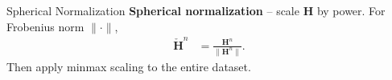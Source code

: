 \documentclass{beamer}
\newcommand{\fignocap}[2]{
	\begin{figure}[!hbtp]
	    \centering
		\texttt{[image: \#2]}
	\end{figure}
}
\begin{document}


  \begin{frame}{Spherical Normalization}
    \textbf{Spherical normalization} -- scale $\mathbf H$ by power. For Frobenius norm $\|\cdot\|$,
    \begin{align}
      \mathbf{\check H}^n &= \frac{\mathbf H^n}{\|\mathbf H^n\|}. \label{eq:sph-intro}
    \end{align}
    Then apply minmax scaling to the entire dataset.
  \end{frame}
\end{document}
